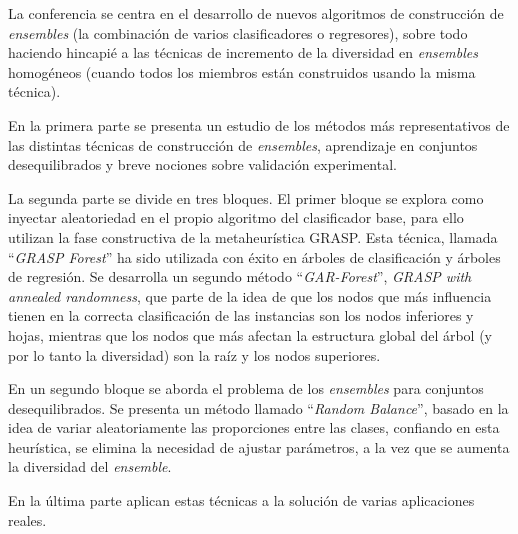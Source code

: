 La conferencia se centra en el desarrollo de nuevos algoritmos de construcción de \textit{ensembles} (la combinación de varios clasificadores o regresores), sobre todo haciendo hincapié a las técnicas de incremento de la diversidad en \textit{ensembles} homogéneos (cuando todos los miembros están construidos usando la misma técnica).

En la primera parte se presenta un estudio de los métodos más representativos de las distintas técnicas de construcción de \textit{ensembles}, aprendizaje en conjuntos desequilibrados y breve nociones sobre validación experimental.

La segunda parte se divide en tres bloques. El primer bloque se explora como inyectar aleatoriedad en el propio algoritmo del clasificador base, para ello utilizan la fase constructiva de la metaheurística GRASP. Esta técnica, llamada “\textit{GRASP Forest}” ha sido utilizada con éxito en árboles de clasificación y árboles de regresión. Se desarrolla un segundo método “\textit{GAR-Forest}”, \textit{GRASP with annealed randomness}, que parte de la idea de que los nodos que más influencia tienen en la correcta clasificación de las instancias son los nodos inferiores y hojas, mientras que los nodos que más afectan la estructura global del árbol (y por lo tanto la diversidad) son la raíz y los nodos superiores.

En un segundo bloque se aborda el problema de los \textit{ensembles} para conjuntos desequilibrados. Se presenta un método llamado “\textit{Random Balance}”, basado en la idea de variar aleatoriamente las proporciones entre las clases, confiando en esta heurística, se elimina la necesidad de ajustar parámetros, a la vez que se aumenta la diversidad del \textit{ensemble}.

En la última parte aplican estas técnicas a la solución de varias aplicaciones reales.


